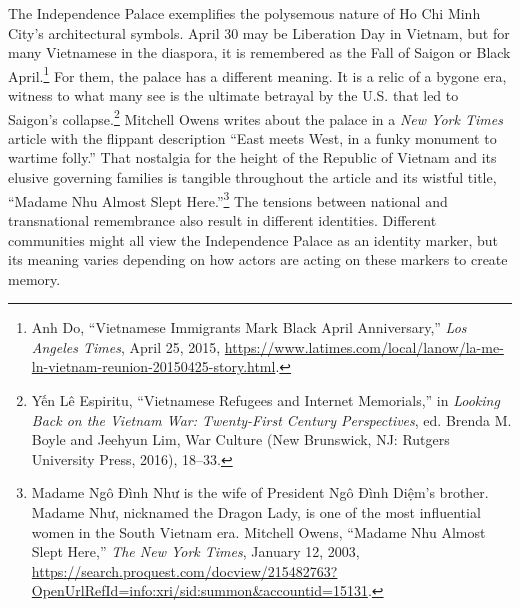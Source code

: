 The Independence Palace exemplifies the polysemous nature of Ho Chi Minh City’s architectural symbols. April 30 may be Liberation Day in Vietnam, but for many Vietnamese in the diaspora, it is remembered as the Fall of Saigon or Black April.\footnote{Anh Do, “Vietnamese Immigrants Mark Black April Anniversary,” \textit{Los Angeles Times}, April 25, 2015, \url{https://www.latimes.com/local/lanow/la-me-ln-vietnam-reunion-20150425-story.html}.} For them, the palace has a different meaning. It is a relic of a bygone era, witness to what many see is the ultimate betrayal by the U.S. that led to Saigon’s collapse.\footnote{Yến Lê Espiritu, “Vietnamese Refugees and Internet Memorials,” in \textit{Looking Back on the Vietnam War: Twenty-First Century Perspectives}, ed. Brenda M. Boyle and Jeehyun Lim, War Culture (New Brunswick, NJ: Rutgers University Press, 2016), 18–33.} Mitchell Owens writes about the palace in a \textit{New York Times} article with the flippant description “East meets West, in a funky monument to wartime folly.” That nostalgia for the height of the Republic of Vietnam and its elusive governing families is tangible throughout the article and its wistful title, “Madame Nhu Almost Slept Here.”\footnote{Madame Ngô Đình Như is the wife of President Ngô Đình Diệm’s brother. Madame Như, nicknamed the Dragon Lady, is one of the most influential women in the South Vietnam era. Mitchell Owens, “Madame Nhu Almost Slept Here,” \textit{The New York Times}, January 12, 2003, \url{https://search.proquest.com/docview/215482763?OpenUrlRefId=info:xri/sid:summon&accountid=15131}.} The tensions between national and transnational remembrance also result in different identities. Different communities might all view the Independence Palace as an identity marker, but its meaning varies depending on how actors are acting on these markers to create memory.


